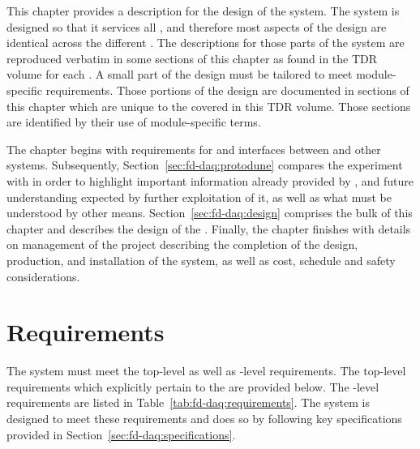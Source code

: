 This chapter provides a description for the design of the 
  system. 
The system is designed so that it services all 
, and therefore most aspects of the design are
identical across the different . 
The descriptions for those parts of the system are reproduced verbatim in some sections of this chapter as found in the TDR volume for each .
A small part of the  design must be tailored to meet module-specific requirements. 
Those portions of the design are documented in sections of this chapter which are unique to the  covered in this TDR volume. 
Those sections are identified by their use of module-specific terms.

The chapter begins with requirements for and interfaces between  and other  systems. 
Subsequently, Section~\ref{sec:fd-daq:protodune} compares the
 experiment with  in order to highlight
important information already provided by , and
future understanding expected by further exploitation of it, as well as what must be understood by other means. 
Section~\ref{sec:fd-daq:design} comprises the bulk of this chapter and
describes the design of the  . 
Finally, the chapter finishes with details on management of the
 project describing the completion of the design,
production, and installation of the system, as well as cost, schedule and
safety considerations.

\section{Requirements}
\label{sec:fd-daq:requirements}


The    system must meet the
 top-level as well as -level
requirements. The top-level requirements which explicitly pertain to
the  are provided below. The -level requirements are 
listed in Table~\ref{tab:fd-daq:requirements}. The system is
designed to meet these requirements and does so by following key
specifications provided in Section~\ref{sec:fd-daq:specifications}. 

